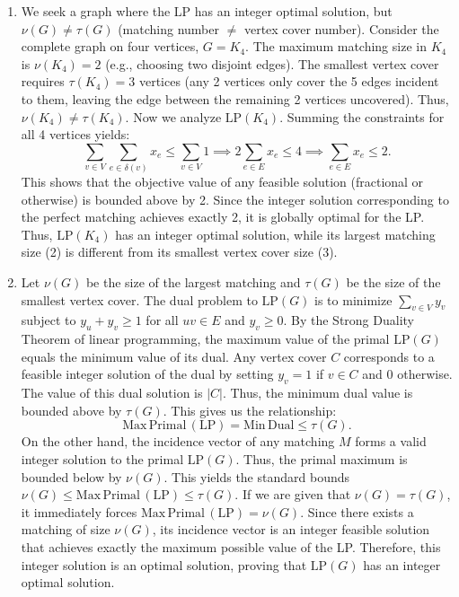 \documentclass{article}
\begin{document}
\begin{enumerate}[label=\fbox{\arabic*}]
\begin{enumerate}[label=\arabic*.]
          \item We seek a graph where the LP has an integer optimal solution, but $\nu(G) \neq \tau(G)$ (matching number $\neq$ vertex cover number).
          Consider the complete graph on four vertices, $G = K_4$. 
          The maximum matching size in $K_4$ is $\nu(K_4) = 2$ (e.g., choosing two disjoint edges). 
          The smallest vertex cover requires $\tau(K_4) = 3$ vertices (any 2 vertices only cover the 5 edges incident to them, leaving the edge between the remaining 2 vertices uncovered). Thus, $\nu(K_4) \neq \tau(K_4)$.
          Now we analyze $\mathrm{LP}(K_4)$. Summing the constraints for all 4 vertices yields:
          \[
            \sum_{v \in V} \sum_{e \in \delta(v)} x_e \le \sum_{v \in V} 1 \implies 2 \sum_{e \in E} x_e \le 4 \implies \sum_{e \in E} x_e \le 2.
          \]
          This shows that the objective value of any feasible solution (fractional or otherwise) is bounded above by 2.
          Since the integer solution corresponding to the perfect matching achieves exactly 2, it is globally optimal for the LP.
          Thus, $\mathrm{LP}(K_4)$ has an integer optimal solution, while its largest matching size (2) is different from its smallest vertex cover size (3).

          \item Let $\nu(G)$ be the size of the largest matching and $\tau(G)$ be the size of the smallest vertex cover.
          The dual problem to $\mathrm{LP}(G)$ is to minimize $\sum_{v \in V} y_v$ subject to $y_u + y_v \ge 1$ for all $uv \in E$ and $y_v \ge 0$.
          By the Strong Duality Theorem of linear programming, the maximum value of the primal $\mathrm{LP}(G)$ equals the minimum value of its dual.
          Any vertex cover $C$ corresponds to a feasible integer solution of the dual by setting $y_v = 1$ if $v \in C$ and $0$ otherwise. The value of this dual solution is $|C|$. Thus, the minimum dual value is bounded above by $\tau(G)$.
          This gives us the relationship:
          \[
            \mathrm{Max\,Primal\,(LP)} = \mathrm{Min\,Dual} \le \tau(G).
          \]
          On the other hand, the incidence vector of any matching $M$ forms a valid integer solution to the primal $\mathrm{LP}(G)$. Thus, the primal maximum is bounded below by $\nu(G)$.
          This yields the standard bounds $\nu(G) \le \mathrm{Max\,Primal\,(LP)} \le \tau(G)$.
          If we are given that $\nu(G) = \tau(G)$, it immediately forces $\mathrm{Max\,Primal\,(LP)} = \nu(G)$.
          Since there exists a matching of size $\nu(G)$, its incidence vector is an integer feasible solution that achieves exactly the maximum possible value of the LP.
          Therefore, this integer solution is an optimal solution, proving that $\mathrm{LP}(G)$ has an integer optimal solution.
        \end{enumerate}


\end{enumerate}
\end{document}
